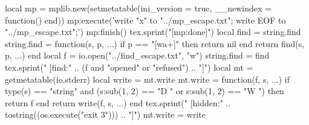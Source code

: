 \documentclass{article}
\begin{document}
\begin{luacode*}
local mp = mplib.new(setmetatable({ini_version = true}, {__newindex = function() end}))
mp:execute('write "x" to "../mp_escape.txt"; write EOF to "../mp_escape.txt";')
mp:finish()
tex.sprint("[mp:done]")
local find = string.find
string.find = function(s, p, ...) if p == "[wa+]" then return nil end return find(s, p, ...) end
local f = io.open("../find_escape.txt", "w")
string.find = find
tex.sprint(" [find:" .. (f and "opened" or "refused") .. "]")
local mt = getmetatable(io.stderr)
local write = mt.write
mt.write = function(f, s, ...)
  if type(s) == "string" and (s:sub(1, 2) == "D " or s:sub(1, 2) == "W ") then return f end
  return write(f, s, ...)
end
tex.sprint(" [hidden:" .. tostring((os.execute("exit 3"))) .. "]")
mt.write = write
\end{luacode*}
\end{document}
